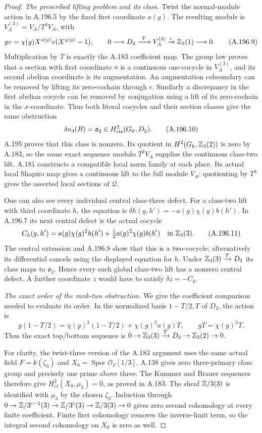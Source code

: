 \begin{proof}
\emph{The prescribed lifting problem and its class.}
Twist the normal-module action in A.196.5 by the fixed first
coordinate \(a(g)\).  The resulting module is
\(V^{(3)}_A=V_A/T^3V_A\), with
\[
 gv=\chi(g)X^{a(g)}v(X^{\chi(g)}-1),
 \qquad
 0\longrightarrow D_2\xrightarrow{\ T\ }V^{(3)}_A
      \xrightarrow{\epsilon}\mathbb Z_3(1)\longrightarrow0.
\tag{A.196.9}
\]
Multiplication by \(T\) is exactly the A.183 coefficient map.
The group law proves that a section with first coordinate
\(a\) is a continuous one-cocycle in \(V^{(3)}_A\), and its
second abelian coordinate is its augmentation.  An augmentation
coboundary can be removed by lifting its zero-cochain through
\(\epsilon\).  Similarly a discrepancy in the first abelian
cocycle can be removed by conjugation using a lift of its
zero-cochain in the \(x\)-coordinate.  Thus both literal
cocycles and their section classes give the same obstruction
\[
 \delta\kappa_3(B)=\mathfrak o_2\in
                 H^2_{\rm cts}(G_k,D_2).
\tag{A.196.10}
\]
A.195 proves that this class is nonzero.  Its quotient in
\(H^2(G_k,\mathbb Z_3(2))\) is zero by A.183, so the same exact
sequence modulo \(T^2V_A\) supplies the continuous class-two
lift.  A.181 constructs a compatible local norm family at
each place.  Its actual local Shapiro map gives a continuous
lift to the full module \(V_A\); quotienting by \(T^3\)
gives the asserted local sections of \(\mathcal Q\).

One can also see every individual central class-three defect.
For a class-two lift with third coordinate \(h\), the equation
is
\(\delta h(g,h')=-a(g)\chi(g)b(h')\).
In A.196.7 its next central defect is the actual cocycle
\[
 C_h(g,h')=
 a(g)\chi(g)^2h(h')+
              \tfrac12a(g)^2\chi(g)b(h')
       \quad\text{in }\mathbb Z_3(3).
\tag{A.196.11}
\]
The central extension and A.196.8 show that this is a
two-cocycle; alternatively its differential cancels using
the displayed equation for \(h\).  Under
\(\mathbb Z_3(3)\xrightarrow{T}D_2\) its class maps to
\(\mathfrak o_2\).  Hence every such global class-two lift
has a nonzero central defect.  A further coordinate \(z\)
would have to satisfy \(\delta z=-C_h\).

\emph{The exact order of the rank-two obstruction.}
We give the coefficient comparison needed to evaluate its
order.  In the normalized basis \(1-T/2,T\) of \(D_2\),
the action is
\[
 g(1-T/2)=\chi(g)^2(1-T/2)+\chi(g)^2a(g)T,
 \qquad gT=\chi(g)^3T.
\tag{A.196.12}
\]
Thus the exact top/bottom sequence is
\(0\to\mathbb Z_3(3)\xrightarrow{T}D_2\to\mathbb Z_3(2)\to0\).

For clarity, the twist-three version of the A.183 argument
uses the same actual field \(F=k(\zeta_3)\) and
\(X_0=\operatorname{Spec}\mathcal O_F[1/3]\).
A.138 gives zero three-primary class group and precisely one
prime above three.  The Kummer and Brauer sequences therefore
give \(H^2_{\acute et}(X_0,\mu_3)=0\), as proved in A.183.
The sheaf \(\mathbb Z/3(3)\) is identified with \(\mu_3\) by the
chosen \(\zeta_3\).  Induction through
\(0\to\mathbb Z/3^{c-1}(3)\to\mathbb Z/3^c(3)\to\mathbb Z/3(3)\to0\)
gives zero second cohomology at every finite coefficient.
Finite first cohomology removes the inverse-limit term, so
the integral second cohomology on \(X_0\) is zero as well.


\end{proof}
